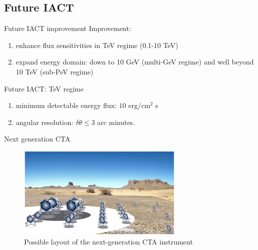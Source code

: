 \documentclass{beamer}
\begin{document}
\subsection{Future IACT}
\begin{frame}{Future IACT improvement}
	Improvement:
	\begin{enumerate}
		\item enhance flux sensitivities in TeV regime (0.1-10 TeV)
		\item expand energy domain: down to 10 GeV (multi-GeV regime) and well beyond 10 TeV (sub-PeV regime)
	\end{enumerate}
\end{frame}


\begin{frame}{Future IACT: TeV regime}
	\begin{enumerate}
		\item minimum detectable energy flux: $10$ erg$/ \text{cm}^2 $ s
		\item angular resolution: $\delta \theta \leq 3$ arc minutes.
	\end{enumerate}
\end{frame}


\begin{frame}{Next generation CTA}
	\begin{figure}[h]
		\includegraphics[width=300px]{next-generationCTA.png}
		\caption{Possible layout of the next-generation CTA instrument}
	\end{figure}
\end{frame}
\end{document}
